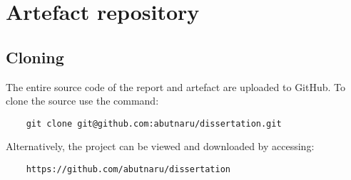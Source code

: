 \chapter{Artefact repository}

\tocless\section{Cloning}
The entire source code of the report and artefact are uploaded to GitHub. To clone the source use the command:
\begin{verbatim}
    git clone git@github.com:abutnaru/dissertation.git
\end{verbatim}

{\parindent0pt Alternatively, the project can be viewed and downloaded by accessing: }

\begin{verbatim}
    https://github.com/abutnaru/dissertation
\end{verbatim}